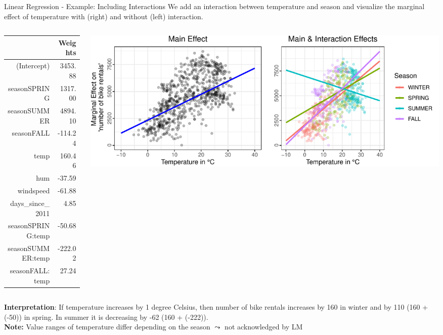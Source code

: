 \documentclass[11pt,compress,t,notes=noshow, aspectratio=169, xcolor=table]{beamer}
\begin{document}
\begin{frame}{Linear Regression - Example: Including Interactions}
We add an interaction between temperature and season and visualize the marginal effect of temperature with (right) and without (left) interaction.
\begin{columns}[T]
\begin{column}{0.25\textwidth}
\begin{tiny}
\begin{table}[ht]
\centering
\begin{tabular}{rr}
  \hline
 & Weights \\ 
  \hline
(Intercept) & 3453.88 \\ 
  seasonSPRING & 1317.00 \\ 
  seasonSUMMER & 4894.10 \\ 
  seasonFALL & -114.24 \\ 
  temp & 160.46 \\ 
  hum & -37.59 \\ 
  windspeed & -61.88 \\ 
  days\_since\_2011 & 4.85 \\ 
  seasonSPRING:temp & -50.68 \\ 
  seasonSUMMER:temp & -222.02 \\ 
  seasonFALL:temp & 27.24 \\ 
   \hline
\end{tabular}
\end{table}
\end{tiny}
\end{column}
\begin{column}{0.7\textwidth}
\includegraphics[width = \textwidth]{slides/interpretable-models/figure/lm_main_vs_interaction_effects.pdf}
\end{column}
\end{columns}
\vfill
\textbf{Interpretation}: If temperature increases by 1 degree Celsius, then number of bike rentals increases by 160 in winter and by 110 (160 + (-50)) in spring. In summer it is decreasing by -62 (160 + (-222)).\\\vspace*{0.2cm}
\textbf{Note:} Value ranges of temperature differ depending on the season $\leadsto$ not acknowledged by LM
\end{frame}
\end{document}
